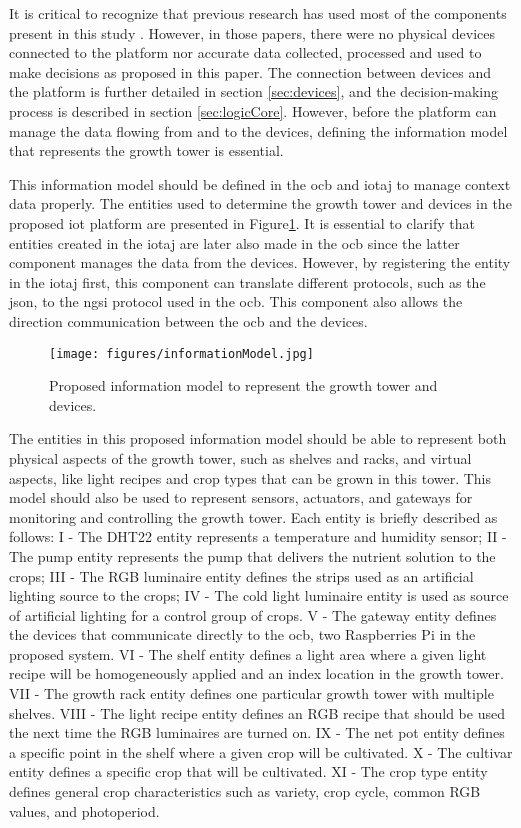 \documentclass[preprint, review, 12pt]{elsarticle}
\begin{document}
It is critical to recognize that previous research has used most of the components present in this study \cite{gomesalves2022, alves2023}. However, in those papers, there were no physical devices connected to the platform nor accurate data collected, processed and used to make decisions as proposed in this paper. The connection between devices and the platform is further detailed in section \ref{sec:devices}, and the decision-making process is described in section \ref{sec:logicCore}. However, before the platform can manage the data flowing from and to the devices, defining the information model that represents the growth tower is essential. 

This information model should be defined in the \gls{ocb} and \gls{iotaj} to manage context data properly. The entities used to determine the growth tower and devices in the proposed \gls{iot} platform are presented in Figure\ref{fig:informationModel}. It is essential to clarify that entities created in the \gls{iotaj} are later also made in the \gls{ocb} since the latter component manages the data from the devices. However, by registering the entity in the \gls{iotaj} first, this component can translate different protocols, such as the \gls{json}, to the \gls{ngsi} protocol used in the \gls{ocb}. This component also allows the direction communication between the \gls{ocb} and the devices. 

\begin{figure}[htbp]
    \centering
    \texttt{[image: figures/informationModel.jpg]}
    \caption{Proposed information model to represent the growth tower and devices.}
    \label{fig:informationModel}
\end{figure}

The entities in this proposed information model should be able to represent both physical aspects of the growth tower, such as shelves and racks, and virtual aspects, like light recipes and crop types that can be grown in this tower. This model should also be used to represent sensors, actuators, and gateways for monitoring and controlling the growth tower. Each entity is briefly described as follows: I - The DHT22 entity represents a temperature and humidity sensor; II - The pump entity represents the pump that delivers the nutrient solution to the crops; III - The RGB luminaire entity defines the strips used as an artificial lighting source to the crops; IV - The cold light luminaire entity is used as source of artificial lighting for a control group of crops. V - The gateway entity defines the devices that communicate directly to the \gls{ocb}, two Raspberries Pi in the proposed system. VI - The shelf entity defines a light area where a given light recipe will be homogeneously applied and an index location in the growth tower. VII - The growth rack entity defines one particular growth tower with multiple shelves. VIII - The light recipe entity defines an RGB recipe that should be used the next time the RGB luminaires are turned on. IX - The net pot entity defines a specific point in the shelf where a given crop will be cultivated. X - The cultivar entity defines a specific crop that will be cultivated. XI - The crop type entity defines general crop characteristics such as variety, crop cycle, common RGB values, and photoperiod. 
\end{document}
